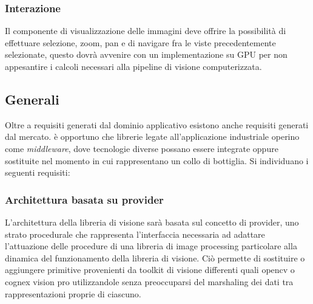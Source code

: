 \subsubsection{Interazione}
Il componente di visualizzazione delle immagini deve offrire la possibilità di effettuare  selezione, zoom, pan e di navigare fra le viste precedentemente selezionate, questo dovrà avvenire con un implementazione su GPU per non appesantire i calcoli necessari alla pipeline di visione computerizzata.

\subsection{Generali}
Oltre a requisiti generati dal dominio applicativo esistono anche requisiti generati dal mercato. è opportuno che librerie legate all'applicazione industriale operino come \emph{middleware}, dove tecnologie diverse possano essere integrate oppure sostituite nel momento in cui rappresentano un collo di bottiglia. Si individuano i seguenti requisiti:

\subsubsection{Architettura basata su provider}
L'architettura della libreria di visione sarà basata sul concetto di provider, uno strato procedurale che rappresenta l'interfaccia necessaria ad adattare l'attuazione delle procedure di una libreria di image processing particolare alla dinamica del funzionamento della libreria di visione. Ciò permette di sostituire o aggiungere primitive provenienti da toolkit di visione differenti quali opencv o cognex vision pro utilizzandole senza preoccuparsi del marshaling dei dati tra rappresentazioni proprie di ciascuno.
